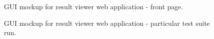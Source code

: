\documentclass[11pt,oneside,final]{fithesis2}
\begin{document}
\begin{figure}[!htb]
    \begin{center}
    \leavevmode
    \centerline{}
    \end{center}
    \caption{GUI mockup for result viewer web application - front page.}
    \label{fig:frontPageMock}
\end{figure}

\begin{figure}[!htb]
    \begin{center}
    \leavevmode
    \centerline{}
    \end{center}
    \caption{GUI mockup for result viewer web application - particular test suite run.}
    \label{fig:particularRunMock}
\end{figure}
\end{document}
